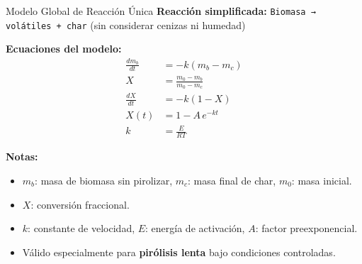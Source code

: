 \documentclass[../../main.tex]{subfiles}
\begin{document}
\begin{frame}{Modelo Global de Reacción Única}
\small
\textbf{Reacción simplificada:} \texttt{Biomasa → volátiles + char} (sin considerar cenizas ni humedad)

\vspace{0.2cm}
\textbf{Ecuaciones del modelo:}
\begin{align*}
\frac{dm_b}{dt} &= -k(m_b - m_c) \\
X &= \frac{m_0 - m_b}{m_0 - m_c} \\
\frac{dX}{dt} &= -k(1 - X) \\
X(t) &= 1 - A\,e^{-kt} \\
k &= \frac{E}{RT}
\end{align*}

\vspace{0.2cm}
\textbf{Notas:}
\begin{itemize}
  \item $m_b$: masa de biomasa sin pirolizar, $m_c$: masa final de char, $m_0$: masa inicial.
  \item $X$: conversión fraccional.
  \item $k$: constante de velocidad, $E$: energía de activación, $A$: factor preexponencial.
  \item Válido especialmente para \textbf{pirólisis lenta} bajo condiciones controladas.
\end{itemize}
\end{frame}

\end{document}
